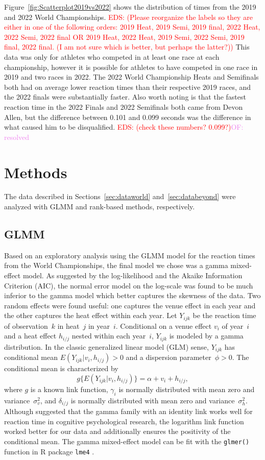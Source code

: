 \documentclass[12pt, letterpaper, titlepage]{article}
\newcommand{\eds}[1]{\textcolor{red}{EDS: (#1)}}
\newcommand{\of}[1]{\textcolor{violet}{OF: #1}}
\begin{document}
Figure~\ref{fig:Scatterplot2019vs2022} shows the distribution of times from the
2019 and 2022 World Championships.  
\eds{Please reorganize the labels so they are either in one of the following 
orders:
2019 Heat, 2019 Semi, 2019 final, 2022 Heat, 2022 Semi, 2022 final  OR
2019 Heat, 2022 Heat, 2019 Semi, 2022 Semi, 2019 final, 2022 final.  
(I am not sure which is better, but perhaps the latter?)}
This data was only for athletes who competed
in at least one race at each championship, however it is possible for athletes
to have competed in one race in 2019 and two races in 2022.  The 2022 World
Championship Heats and Semifinals both had on average lower reaction times than
their respective 2019 races, and the 2022 finals were substantially faster. Also
worth noting is that the fastest reaction time in the 2022 Finals and 2022
Semifinals both came from Devon Allen, but the difference between 0.101 and 0.099
seconds was the difference in what caused him to be disqualified. \eds{check 
these numbers? 0.099?}\of{resolved}



\section{Methods} \label{sec:Methods}

The data described in Sections~\ref{sec:dataworld} and~\ref{sec:databeyond} were
analyzed with GLMM and rank-based methods, respectively.


\subsection{GLMM}\label{sec:glmm}
Based on an exploratory analysis using the GLMM model for the reaction times
from the World Championships, the final model we chose was a gamma mixed-effect 
model. As suggested by the log-likelihood and the Akaike Information
Criterion (AIC), the normal error model on the log-scale was found to be
much inferior to the gamma model which better captures the skewness of the
data. Two random effects were found useful: one captures the venue effect in
each year and the other captures the heat effect within each year.
Let $Y_{ijk}$ be the reaction time of observation~$k$ in heat~$j$ in year~$i$.
Conditional on a venue effect $v_i$ of year~$i$ and a heat effect
$h_{i/j}$ nested within each year~$i$, $Y_{ijk}$ is modeled by a
gamma distribution. In the classic generalized linear model (GLM) sense,
$Y_{ijk}$ has conditional mean $E(Y_{ijk} | v_i, h_{i/j}) > 0$ and a
dispersion parameter~$\phi > 0$. The conditional mean is characterized by
\[
g\{E(Y_{ijk} | v_i, h_{i/j})\} = \alpha + v_i + h_{i/j},
\]
where $g$ is a known link function,
$\gamma_i$ is normally distributed with mean zero and
variance~$\sigma_v^2$, and $\delta_{i/j}$ is normally distributed with mean
zero and variance~$\sigma_h^2$.
Although \citet{lo2015idlink} suggested that the gamma 
family with an identity link works well for reaction time in cognitive
psychological research, the logarithm
link function worked better for our data and additionally ensures the positivity
of the conditional mean. The gamma mixed-effect model can be fit with the 
\texttt{glmer()} function in R package \texttt{lme4} \citep{lme4}.
\end{document}
